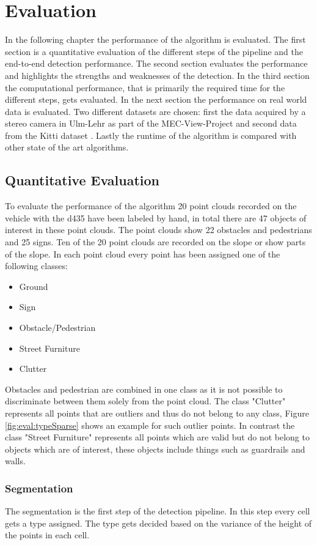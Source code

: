 \chapter{Evaluation} \label{sec:eval}
In the following chapter the performance of the algorithm is evaluated. 
The first section is a quantitative evaluation of the different steps of the pipeline and the end-to-end detection performance. The second
section evaluates the performance and highlights the strengths and weaknesses of the detection. In the third section
the computational performance, that is primarily the required time for the different steps, gets evaluated. In the next section the performance on
real world data is evaluated. Two different datasets are chosen: first the data acquired by a stereo camera in Ulm-Lehr as part of the MEC-View-Project \cite{mec} and second data from the Kitti dataset \cite{Menze2015CVPR}.  
Lastly the runtime of the algorithm is compared with other state of the art algorithms.

\section{Quantitative Evaluation}
To evaluate the performance of the algorithm 20 point clouds recorded on the vehicle with the \ac{d435} have been labeled by hand, in total there are 47 objects of interest in these point clouds. The point clouds show 22 obstacles and pedestrians and 25 signs. Ten of the 20 point clouds are recorded on the slope or show parts of the slope.
In each point cloud every point has been assigned one of the following classes:
\begin{itemize}
    \item Ground
    \item Sign
    \item Obstacle/Pedestrian
    \item Street Furniture
    \item Clutter
\end{itemize}
Obstacles and pedestrian are combined in one class as it is not possible to discriminate between them solely from the point cloud. 
The class "Clutter" represents all points that are outliers and thus do not belong to any class, Figure \ref{fig:eval:typeSparse} shows an example for such outlier points.
In contrast the class "Street Furniture" represents all points which are valid but do not belong to objects which are of interest, these objects include
things such as guardrails and walls.

\subsection{Segmentation}
The segmentation is the first step of the detection pipeline. In this step every cell gets a type assigned. The type gets decided based on the variance of the height of the points in each cell.

